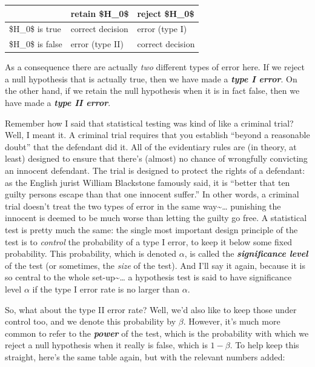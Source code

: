 \documentclass[
]{book}
\begin{document}
\begin{tabular}{l|l|l}
\hline
 & retain \$H\_0\$ & reject \$H\_0\$\\
\hline
\$H\_0\$ is true & correct decision & error (type I)\\
\hline
\$H\_0\$ is false & error (type II) & correct decision\\
\hline
\end{tabular}

As a consequence there are actually \emph{two} different types of error here. If we reject a null hypothesis that is actually true, then we have made a \textbf{\emph{type I error}}. On the other hand, if we retain the null hypothesis when it is in fact false, then we have made a \textbf{\emph{type II error}}.

Remember how I said that statistical testing was kind of like a criminal trial? Well, I meant it. A criminal trial requires that you establish ``beyond a reasonable doubt'' that the defendant did it. All of the evidentiary rules are (in theory, at least) designed to ensure that there's (almost) no chance of wrongfully convicting an innocent defendant. The trial is designed to protect the rights of a defendant: as the English jurist William Blackstone famously said, it is ``better that ten guilty persons escape than that one innocent suffer.'' In other words, a criminal trial doesn't treat the two types of error in the same way\textasciitilde\ldots{} punishing the innocent is deemed to be much worse than letting the guilty go free. A statistical test is pretty much the same: the single most important design principle of the test is to \emph{control} the probability of a type I error, to keep it below some fixed probability. This probability, which is denoted \(\alpha\), is called the \textbf{\emph{significance level}} of the test (or sometimes, the \emph{size} of the test). And I'll say it again, because it is so central to the whole set-up\textasciitilde\ldots{} a hypothesis test is said to have significance level \(\alpha\) if the type I error rate is no larger than \(\alpha\).

So, what about the type II error rate? Well, we'd also like to keep those under control too, and we denote this probability by \(\beta\). However, it's much more common to refer to the \textbf{\emph{power}} of the test, which is the probability with which we reject a null hypothesis when it really is false, which is \(1-\beta\). To help keep this straight, here's the same table again, but with the relevant numbers added:
\end{document}
